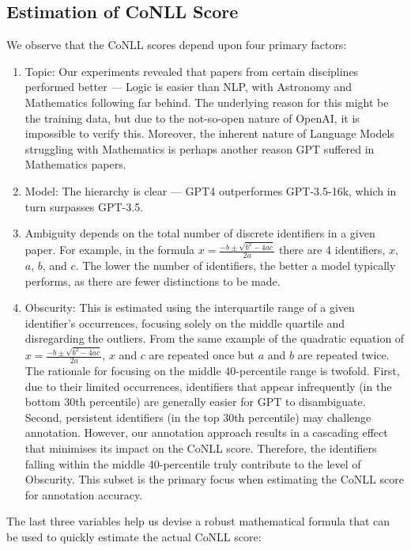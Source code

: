\subsection{Estimation of CoNLL Score}
We observe that the CoNLL scores depend upon four primary factors: 
    \begin{enumerate}
        \item Topic: Our experiments revealed that papers from certain disciplines performed better — Logic is easier than NLP, with Astronomy and Mathematics following far behind. The underlying reason for this might be the training data, but due to the not-so-open nature of OpenAI, it is impossible to verify this. Moreover, the inherent nature of Language Models struggling with Mathematics is perhaps another reason GPT suffered in Mathematics papers.
        
        \item Model: The hierarchy is clear — GPT4 outperformes GPT-3.5-16k, which in turn surpasses GPT-3.5. 

        \item Ambiguity depends on the total number of discrete identifiers in a given paper. For example, in the formula $x = \frac{-b \pm \sqrt{b^2 - 4ac}}{2a}$ there are 4 identifiers, $x$, $a$, $b$, and $c$. The lower the number of identifiers, the better a model typically performs, as there are fewer distinctions to be made.
        
        \item Obscurity: This is estimated using the interquartile range of a given identifier's occurrences, focusing solely on the middle quartile and disregarding the outliers. From the same example of the quadratic equation of $x = \frac{-b \pm \sqrt{b^2 - 4ac}}{2a}$, $x$ and $c$ are repeated once but $a$ and $b$ are repeated twice. The rationale for focusing on the middle 40-percentile range is twofold. First, due to their limited occurrences, identifiers that appear infrequently (in the bottom 30th percentile) are generally easier for GPT to disambiguate. Second, persistent identifiers (in the top 30th percentile) may challenge annotation. However, our annotation approach results in a cascading effect that minimises its impact on the CoNLL score. Therefore, the identifiers falling within the middle 40-percentile truly contribute to the level of Obscurity. This subset is the primary focus when estimating the CoNLL score for annotation accuracy.
    \end{enumerate}

The last three variables help us devise a robust mathematical formula that can be used to quickly estimate the actual CoNLL score:

